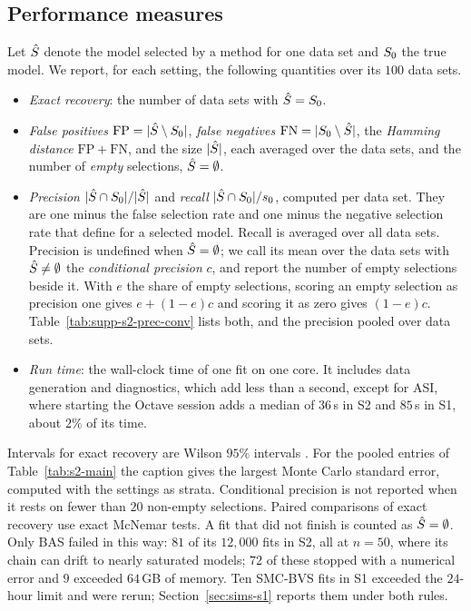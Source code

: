 \subsection{Performance measures}\label{sec:sims-metrics}

Let $\hat S$ denote the model selected by a method for one data set and $S_0$ the true model. We report, for each
setting, the following quantities over its $100$ data sets.
\begin{itemize}
  \item \emph{Exact recovery}: the number of data sets with $\hat S=S_0$.
  \item \emph{False positives} $\mathrm{FP}=\lvert \hat S\setminus S_0\rvert$, \emph{false negatives}
  $\mathrm{FN}=\lvert S_0\setminus\hat S\rvert$, the \emph{Hamming distance} $\mathrm{FP}+\mathrm{FN}$, and the size
  $\lvert \hat S\rvert$, each averaged over the data sets, and the number of \emph{empty} selections, $\hat S=\emptyset$.
  \item \emph{Precision} $\lvert \hat S\cap S_0\rvert/\lvert \hat S\rvert$ and \emph{recall} $\lvert \hat S\cap S_0\rvert/s_0$, computed per
  data set. They are one minus the false selection rate and one minus the negative selection rate that
  \citet[Sec.~4.2]{SongLiang2015} define for a selected model. Recall is averaged over all data sets. Precision is
  undefined when $\hat S=\emptyset$; we call its mean over the data sets with $\hat S\neq\emptyset$ the
  \emph{conditional precision} $c$, and report the number of empty selections beside it. With $e$ the share of empty
  selections, scoring an empty selection as precision one gives $e+(1-e)c$ and scoring it as zero gives $(1-e)c$.
  Table~\ref{tab:supp-s2-prec-conv} lists both, and the precision pooled over data sets.
  \item \emph{Run time}: the wall-clock time of one fit on one core. It includes data generation and diagnostics,
  which add less than a second, except for ASI, where starting the Octave session adds a median of $36$\,s in S2 and
  $85$\,s in S1, about $2\%$ of its time.
\end{itemize}
Intervals for exact recovery are Wilson $95\%$ intervals \citep{Wilson1927}. For the pooled entries of
Table~\ref{tab:s2-main} the caption gives the largest Monte Carlo standard error, computed with the settings as
strata. Conditional precision is not reported when it rests on fewer than $20$ non-empty selections. Paired
comparisons of exact recovery use exact McNemar tests. A fit that did not finish is counted as $\hat S=\emptyset$.
Only BAS failed in this way: $81$ of its $12{,}000$ fits in S2, all at $n=50$, where its chain can drift to nearly
saturated models; $72$ of these stopped with a numerical error and $9$ exceeded $64$\,GB of memory. Ten SMC-BVS fits
in S1 exceeded the $24$-hour limit and were rerun; Section~\ref{sec:sims-s1} reports them under both rules.

